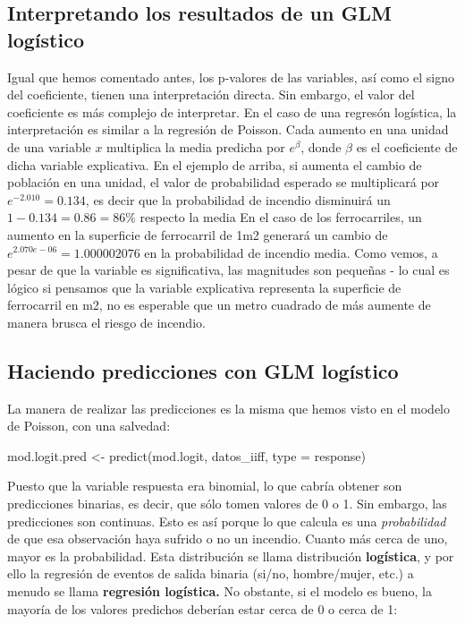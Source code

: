 \documentclass[
  letterpaper,
  DIV=11,
  numbers=noendperiod]{scrreprt}
\newenvironment{Shaded}{\begin{snugshade}}{\end{snugshade}}
\newcommand{\AttributeTok}[1]{\textcolor[rgb]{0.40,0.45,0.13}{#1}}
\newcommand{\FunctionTok}[1]{\textcolor[rgb]{0.28,0.35,0.67}{#1}}
\newcommand{\NormalTok}[1]{\textcolor[rgb]{0.00,0.23,0.31}{#1}}
\newcommand{\OtherTok}[1]{\textcolor[rgb]{0.00,0.23,0.31}{#1}}
\newcommand{\StringTok}[1]{\textcolor[rgb]{0.13,0.47,0.30}{#1}}
\begin{document}
\hypertarget{interpretando-los-resultados-de-un-glm-loguxedstico}{%
\subsection{Interpretando los resultados de un GLM
logístico}\label{interpretando-los-resultados-de-un-glm-loguxedstico}}

Igual que hemos comentado antes, los p-valores de las variables, así
como el signo del coeficiente, tienen una interpretación directa. Sin
embargo, el valor del coeficiente es más complejo de interpretar. En el
caso de una regresón logística, la interpretación es similar a la
regresión de Poisson. Cada aumento en una unidad de una variable \(x\)
multiplica la media predicha por \(e^\beta\), donde \(\beta\) es el
coeficiente de dicha variable explicativa. En el ejemplo de arriba, si
aumenta el cambio de población en una unidad, el valor de probabilidad
esperado se multiplicará por \(e^{-2.010} = 0.134\), es decir que la
probabilidad de incendio disminuirá un \(1-0.134 = 0.86 = 86\%\)
respecto la media En el caso de los ferrocarriles, un aumento en la
superficie de ferrocarril de 1m2 generará un cambio de
\(e^{2.070e-06}= 1.000002076\) en la probabilidad de incendio media.
Como vemos, a pesar de que la variable es significativa, las magnitudes
son pequeñas - lo cual es lógico si pensamos que la variable explicativa
representa la superficie de ferrocarril en m2, no es esperable que un
metro cuadrado de más aumente de manera brusca el riesgo de incendio.

\hypertarget{haciendo-predicciones-con-glm-loguxedstico}{%
\subsection{Haciendo predicciones con GLM
logístico}\label{haciendo-predicciones-con-glm-loguxedstico}}

La manera de realizar las predicciones es la misma que hemos visto en el
modelo de Poisson, con una salvedad:

\begin{Shaded}
\begin{Highlighting}[]
\NormalTok{mod.logit.pred }\OtherTok{\textless{}{-}} \FunctionTok{predict}\NormalTok{(mod.logit, datos\_iiff, }\AttributeTok{type =} \StringTok{\textquotesingle{}response\textquotesingle{}}\NormalTok{)}
\end{Highlighting}
\end{Shaded}

Puesto que la variable respuesta era binomial, lo que cabría obtener son
predicciones binarias, es decir, que sólo tomen valores de 0 o 1. Sin
embargo, las predicciones son continuas. Esto es así porque lo que
calcula es una \emph{probabilidad} de que esa observación haya sufrido o
no un incendio. Cuanto más cerca de uno, mayor es la probabilidad. Esta
distribución se llama distribución \textbf{logística}, y por ello la
regresión de eventos de salida binaria (si/no, hombre/mujer, etc.) a
menudo se llama \textbf{regresión logística.} No obstante, si el modelo
es bueno, la mayoría de los valores predichos deberían estar cerca de 0
o cerca de 1:
\end{document}
